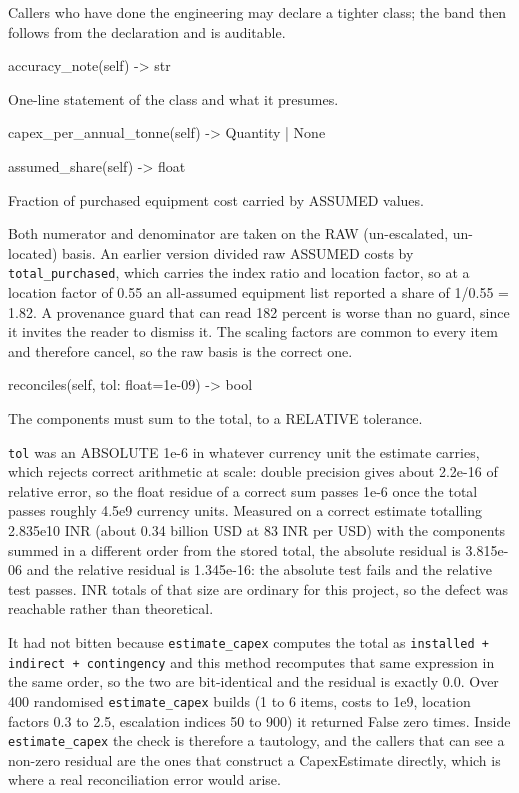 \documentclass[10pt,a4paper,twoside]{report}
\begin{document}
Callers who have done the engineering may declare a tighter class; the band then follows from the declaration and is auditable.

\begin{verbatimsmall}
accuracy_note(self) -> str
\end{verbatimsmall}

One-line statement of the class and what it presumes.

\begin{verbatimsmall}
capex_per_annual_tonne(self) -> Quantity | None
\end{verbatimsmall}

\begin{verbatimsmall}
assumed_share(self) -> float
\end{verbatimsmall}

Fraction of purchased equipment cost carried by ASSUMED values.

Both numerator and denominator are taken on the RAW (un-escalated, un-located) basis. An earlier version divided raw ASSUMED costs by \texttt{total\_purchased}, which carries the index ratio and location factor, so at a location factor of 0.55 an all-assumed equipment list reported a share of 1/0.55 = 1.82. A provenance guard that can read 182 percent is worse than no guard, since it invites the reader to dismiss it. The scaling factors are common to every item and therefore cancel, so the raw basis is the correct one.

\begin{verbatimsmall}
reconciles(self, tol: float=1e-09) -> bool
\end{verbatimsmall}

The components must sum to the total, to a RELATIVE tolerance.

\texttt{tol} was an ABSOLUTE 1e-6 in whatever currency unit the estimate carries, which rejects correct arithmetic at scale: double precision gives about 2.2e-16 of relative error, so the float residue of a correct sum passes 1e-6 once the total passes roughly 4.5e9 currency units. Measured on a correct estimate totalling 2.835e10 INR (about 0.34 billion USD at 83 INR per USD) with the components summed in a different order from the stored total, the absolute residual is 3.815e-06 and the relative residual is 1.345e-16: the absolute test fails and the relative test passes. INR totals of that size are ordinary for this project, so the defect was reachable rather than theoretical.

It had not bitten because \texttt{estimate\_capex} computes the total as \texttt{installed + indirect + contingency} and this method recomputes that same expression in the same order, so the two are bit-identical and the residual is exactly 0.0. Over 400 randomised \texttt{estimate\_capex} builds (1 to 6 items, costs to 1e9, location factors 0.3 to 2.5, escalation indices 50 to 900) it returned False zero times. Inside \texttt{estimate\_capex} the check is therefore a tautology, and the callers that can see a non-zero residual are the ones that construct a CapexEstimate directly, which is where a real reconciliation error would arise.
\end{document}
